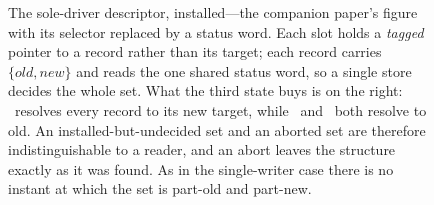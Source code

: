 \begin{figure}[t]
\caption{The sole-driver descriptor, installed---the companion paper's figure
with its selector replaced by a status word. Each slot holds a \emph{tagged}
pointer to a record rather than its target; each record carries
$\{\mathit{old},\mathit{new}\}$ and reads the one shared status word, so a single
store decides the whole set. What the third state buys is on the right:
\SUCCEEDED\ resolves every record to its new target, while \UNDECIDED\ and
\FAILED\ both resolve to old. An installed-but-undecided set and an aborted set
are therefore indistinguishable to a reader, and an abort leaves the structure
exactly as it was found. As in the single-writer case there is no instant at
which the set is part-old and part-new.}
\label{fig:tristate}
\end{figure}
